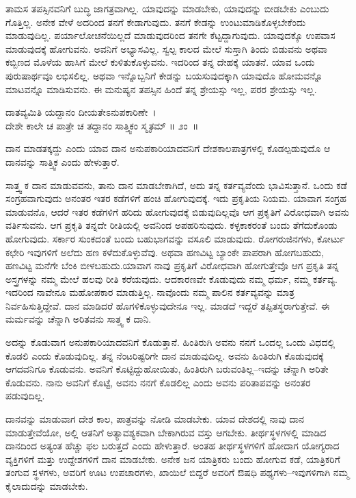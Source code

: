ತಾಮಸ ತಪಸ್ಸಿನವನಿಗೆ ಬುದ್ಧಿ ಜಾಗತ್ರವಾಗಿಲ್ಲ. ಯಾವುದನ್ನು ಮಾಡಬೇಕು, ಯಾವುದನ್ನು ಬೀಡಬೇಕು ಎಂಬುದು ಗೊತ್ತಿಲ್ಲ. ಅನೇಕ ವೇಳೆ ಅದರಿಂದ ತನಗೆ ಕೇಡಾಗುವುದು. ತನಗೆ ಕೇಡನ್ನು ಉಂಟುಮಾಡಿಕೊಳ್ಳಬೇಕೆಂದು ಮಾಡುವುದಿಲ್ಲ. ಪರ್ಯಾಲೋಚನೆಯಿಲ್ಲದೆ ಮಾಡುವುದರಿಂದ ತನಗೇ ಕೆಟ್ಟದ್ದಾಗುವುದು. ಯಾವುದಕ್ಕೊ ಉಪವಾಸ ಮಾಡುವುದಕ್ಕೆ ಹೋಗುವನು. ಅವನಿಗೆ ಅಭ್ಯಾಸವಿಲ್ಲ. ಸ್ವಲ್ಪ ಕಾಲದ ಮೇಲೆ ಸುಸ್ತಾಗಿ ತಿಂದು ಬಿಡುವನು ಅಥವಾ ಕಬ್ಬಿಣದ ಮೊಳೆಯ ಹಾಸಿಗೆ ಮೇಲೆ ಕುಳಿತುಕೊಳ್ಳುವನು. ಇದರಿಂದ ತನ್ನ ದೇಹಕ್ಕೆ ಯಾತನೆ. ಯಾವ ಒಂದು ಪುರುಷಾರ್ಥವೂ ಲಭಿಸಲಿಲ್ಲ. ಅಥವಾ ಇನ್ನೊಬ್ಬನಿಗೆ ಕೇಡನ್ನು ಬಯಸುವುದಕ್ಕಾಗಿ ಯಾವುದೊ ಹೋಮವನ್ನೊ ಮಾಟವನ್ನೊ ಮಾಡಿಸುವನು. ಈ ಮನುಷ್ಯನ ತಪಸ್ಸಿನ ಹಿಂದೆ ತನ್ನ ಶ್ರೇಯಸ್ಸು ಇಲ್ಲ, ಪರರ ಶ್ರೇಯಸ್ಸು ಇಲ್ಲ.

\begin{shloka}
ದಾತವ್ಯಮಿತಿ ಯದ್ದಾನಂ ದೀಯತೇಽನುಪಕಾರಿಣೇ~।\\ದೇಶೇ ಕಾಲೇ ಚ ಪಾತ್ರೇ ಚ ತದ್ದಾನಂ ಸಾತ್ತ್ವಿಕಂ ಸ್ಮೃತಮ್ \hfill॥ ೨ಂ~॥
\end{shloka}

\begin{artha}
ದಾನ ಮಾಡತಕ್ಕದ್ದು ಎಂದು ಯಾವ ದಾನ ಅನುಪಕಾರಿಯಾದವನಿಗೆ ದೇಶಕಾಲಪಾತ್ರಗಳಲ್ಲಿ ಕೊಡಲ್ಪಡುವುದೊ ಆ ದಾನವನ್ನು ಸಾತ್ತ್ವಿಕ ಎಂದು ಹೇಳುತ್ತಾರೆ.
\end{artha}

ಸಾತ್ತ್ವ ಕ ದಾನ ಮಾಡುವವನು, ತಾನು ದಾನ ಮಾಡಬೇಕಾಗಿದೆ, ಅದು ತನ್ನ ಕರ್ತವ್ಯವೆಂದು ಭಾವಿಸುತ್ತಾನೆ. ಒಂದು ಕಡೆ ಸಂಗ್ರಹವಾಗುವುದು ಅನಂತರ ಇತರ ಕಡೆಗಳಿಗೆ ಹಂಚಿ ಹೋಗುವುದಕ್ಕೆ. ಇದು ಪ್ರಕೃತಿಯ ನಿಯಮ. ಯಾವಾಗ ಸಂಗ್ರಹ ಮಾಡುವನೊ, ಆದರೆ ಇತರ ಕಡೆಗಳಿಗೆ ಹರಿದು ಹೋಗುವುದಕ್ಕೆ ಬಿಡುವುದಿಲ್ಲವೊ ಆಗ ಪ್ರಕೃತಿಗೆ ವಿರೋಧವಾಗಿ ಅವನು ವರ್ತಿಸುವನು. ಆಗ ಪ್ರಕೃತಿ ತನ್ನದೇ ರೀತಿಯಲ್ಲಿ ಅವನಿಂದ ಅಪಹರಿಸುವುದು. ಕಳ್ಳಕಾಕರಂತೆ ಬಂದು ತೆಗೆದುಕೊಂಡು ಹೋಗುವುದು. ಸರ್ಕಾರ ಸುಂಕದಂತೆ ಬಂದು ಬಹುಭಾಗವನ್ನು ವಸೂಲಿ ಮಾಡುವುದು. ರೋಗರುಜಿನಗಳು, ಕೋರ್ಟು ಕಛೇರಿ ಇವುಗಳಿಗೆ ಅಲೆದು ಹಣ ಕಳೆದುಕೊಳ್ಳುವೆವು. ಅಥವಾ ಹಣವಿಟ್ಟ ಬ್ಯಾಂಕೇ ಪಾಪರಾಗಿ ಹೋಗಬಹುದು, ಹಣವಿಟ್ಟ ಮನೆಗೇ ಬೆಂಕಿ ಬೀಳಬಹುದು.\break ಯಾವಾಗ ನಾವು ಪ್ರಕೃತಿಗೆ ವಿರೋಧವಾಗಿ ಹೋಗುತ್ತೇವೊ ಆಗ ಪ್ರಕೃತಿ ತನ್ನ ಅಸ್ತ್ರಗಳನ್ನು ನಮ್ಮ ಮೇಲೆ ಹಲವು ರೀತಿ ಕರೆಯವುದು. ಆದಕಾರಣವೇ ಕೊಡುವುದು ನಮ್ಮ ಧರ್ಮ, ನಮ್ಮ ಕರ್ತವ್ಯ. ಇದರಿಂದ ನಾವೇನೂ ಮಹೋಪಕಾರ ಮಾಡುತ್ತಿಲ್ಲ. ನಾವೊಂದು ನಮ್ಮ ಪಾಲಿನ ಕರ್ತವ್ಯವನ್ನು ಮಾತ್ರ ನಿರ್ವಹಿಸುತ್ತಿದ್ದೇವೆ. ದಾನ ಮಾಡಿದರೆ ಹೊಗಳಿಕೊಳ್ಳುವುದೇನೂ ಇಲ್ಲ. ಮಾಡದೆ ಇದ್ದರೆ ತಪ್ಪಿತಸ್ಥರಾಗುತ್ತೇವೆ. ಈ ಮರ್ಮವನ್ನು ಚೆನ್ನಾಗಿ ಅರಿತವನು ಸಾತ್ತ್ವ ಕ ದಾನಿ.

ಅದನ್ನು ಕೊಡುವಾಗ ಅನುಪಕಾರಿಯಾದವನಿಗೆ ಕೊಡುತ್ತಾನೆ. ಹಿಂತಿರುಗಿ ಅವನು ನನಗೆ ಒಂದಲ್ಲ ಒಂದು ವಿಧದಲ್ಲಿ ಕೊಡಲಿ ಎಂದು ಕೊಡುವುದಿಲ್ಲ. ತನ್ನ ನೆಂಟರಿಷ್ಟರಿಗೇ ದಾನ ಮಾಡುವುದಿಲ್ಲ. ಅವನು ಹಿಂತಿರುಗಿ ಕೊಡುವುದಕ್ಕೆ ಆಗದವನಿಗೂ ಕೊಡುವನು. ಅವನಿಗೆ ಕೊಟ್ಟಿದ್ದು\break ಹೋಯಿತು, ಹಿಂತಿರುಗಿ ಬರುವಂತಿಲ್ಲ–ಇದನ್ನು ಚೆನ್ನಾಗಿ ಅರಿತೇ ಕೊಡುವನು. ನಾನು ಅವನಿಗೆ ಕೊಟ್ಟೆ, ಅವನು ನನಗೆ ಕೊಡಲಿಲ್ಲ ಎಂದು ಅವನು ಪರಿತಾಪವನ್ನು ಅನಂತರ ಪಡುವುದಿಲ್ಲ.

ದಾನವನ್ನು ಮಾಡುವಾಗ ದೇಶ ಕಾಲ, ಪಾತ್ರವನ್ನು ನೋಡಿ ಮಾಡಬೇಕು. ಯಾವ ದೇಶದಲ್ಲಿ ನಾವು ದಾನ ಮಾಡುತ್ತೇವೆಯೋ, ಅಲ್ಲಿ ಆತನಿಗೆ ಅತ್ಯಾವಶ್ಯಕವಾಗಿ ಬೇಕಾಗಿರುವ ವಸ್ತು ಆಗಬೇಕು. ತೀರ್ಥಸ್ಥಳಗಳಲ್ಲಿ ಮಾಡಿದ ದಾನದಿಂದ ಅತ್ಯಂತ ಹೆಚ್ಚು ಫಲ ಬರುತ್ತದೆ ಎಂದು ಹೇಳುತ್ತಾರೆ. ಅಂತಹ ತೀರ್ಥಸ್ಥಳಗಳಿಗೆ ಹೋದಾಗ ಯೋಗ್ಯರಾದ ವ್ಯಕ್ತಿಗಳಿಗೆ ಮತ್ತು ಉದ್ದೇಶಗಳಿಗೆ ದಾನ ಮಾಡಬೇಕು. ಅನೇಕ ಜನ ಯಾತ್ರಿಕರು ಬಂದು ಹೋಗುವ ಕಡೆ, ಯಾತ್ರಿಕರಿಗೆ ತಂಗುವ ಸ್ಥಳಗಳು, ಅವರಿಗೆ ಊಟ ಉಪಚಾರಗಳು, ಖಾಯಿಲೆ ಬಿದ್ದರೆ ಅವರಿಗೆ ಔಷಧಿ ಪಥ್ಯಗಳು–ಇವುಗಳಿಗಾಗಿ ನಮ್ಮ ಕೈಲಾದುದನ್ನು ಮಾಡಬೇಕು.

